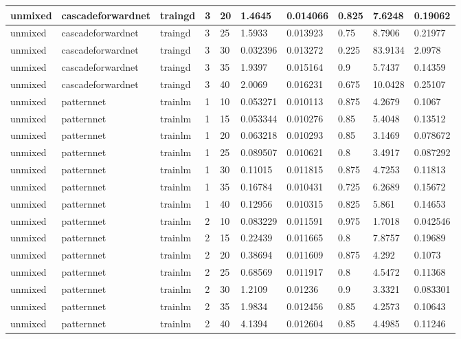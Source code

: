 \begin{longtable}{lllllllll}
unmixed & cascadeforwardnet & traingd & 3 & 20 & 1.4645 & 0.014066 & 0.825 & 7.6248 & 0.19062 \\ \hline 
unmixed & cascadeforwardnet & traingd & 3 & 25 & 1.5933 & 0.013923 & 0.75 & 8.7906 & 0.21977 \\ \hline 
unmixed & cascadeforwardnet & traingd & 3 & 30 & 0.032396 & 0.013272 & 0.225 & 83.9134 & 2.0978 \\ \hline 
unmixed & cascadeforwardnet & traingd & 3 & 35 & 1.9397 & 0.015164 & 0.9 & 5.7437 & 0.14359 \\ \hline 
unmixed & cascadeforwardnet & traingd & 3 & 40 & 2.0069 & 0.016231 & 0.675 & 10.0428 & 0.25107 \\ \hline 
unmixed & patternnet & trainlm & 1 & 10 & 0.053271 & 0.010113 & 0.875 & 4.2679 & 0.1067 \\ \hline 
unmixed & patternnet & trainlm & 1 & 15 & 0.053344 & 0.010276 & 0.85 & 5.4048 & 0.13512 \\ \hline 
unmixed & patternnet & trainlm & 1 & 20 & 0.063218 & 0.010293 & 0.85 & 3.1469 & 0.078672 \\ \hline 
unmixed & patternnet & trainlm & 1 & 25 & 0.089507 & 0.010621 & 0.8 & 3.4917 & 0.087292 \\ \hline 
unmixed & patternnet & trainlm & 1 & 30 & 0.11015 & 0.011815 & 0.875 & 4.7253 & 0.11813 \\ \hline 
unmixed & patternnet & trainlm & 1 & 35 & 0.16784 & 0.010431 & 0.725 & 6.2689 & 0.15672 \\ \hline 
unmixed & patternnet & trainlm & 1 & 40 & 0.12956 & 0.010315 & 0.825 & 5.861 & 0.14653 \\ \hline 
unmixed & patternnet & trainlm & 2 & 10 & 0.083229 & 0.011591 & 0.975 & 1.7018 & 0.042546 \\ \hline 
unmixed & patternnet & trainlm & 2 & 15 & 0.22439 & 0.011665 & 0.8 & 7.8757 & 0.19689 \\ \hline 
unmixed & patternnet & trainlm & 2 & 20 & 0.38694 & 0.011609 & 0.875 & 4.292 & 0.1073 \\ \hline 
unmixed & patternnet & trainlm & 2 & 25 & 0.68569 & 0.011917 & 0.8 & 4.5472 & 0.11368 \\ \hline 
unmixed & patternnet & trainlm & 2 & 30 & 1.2109 & 0.01236 & 0.9 & 3.3321 & 0.083301 \\ \hline 
unmixed & patternnet & trainlm & 2 & 35 & 1.9834 & 0.012456 & 0.85 & 4.2573 & 0.10643 \\ \hline 
unmixed & patternnet & trainlm & 2 & 40 & 4.1394 & 0.012604 & 0.85 & 4.4985 & 0.11246 \\ \hline 

\end{longtable}

